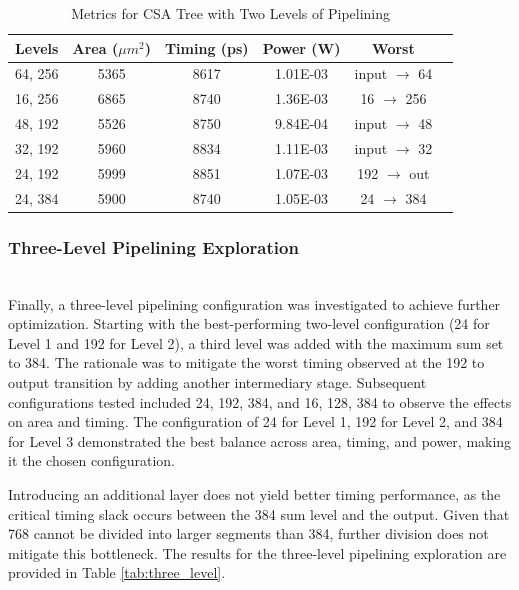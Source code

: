 \documentclass[conference]{IEEEtran}
\begin{document}
\begin{table}[h]
    \centering
    \caption{Metrics for CSA Tree with Two Levels of Pipelining}
    \label{tab:two_level}
    \begin{tabular}{@{}cccccc@{}}
        \toprule
        \textbf{Levels} & \textbf{Area ($\mu m^2$)} & \textbf{Timing (ps)} & \textbf{Power (W)} & \textbf{Worst} \\
        \midrule
        64, 256 & 5365 & 8617 & 1.01E-03 & input $\rightarrow$ 64 \\
        16, 256 & 6865 & 8740 & 1.36E-03 & 16 $\rightarrow$ 256 \\
        48, 192 & 5526 & 8750 & 9.84E-04 & input $\rightarrow$ 48 \\
        32, 192 & 5960 & 8834 & 1.11E-03 & input $\rightarrow$ 32 \\
        24, 192 & 5999 & 8851 & 1.07E-03 & 192 $\rightarrow$ out\\
        24, 384 & 5900 & 8740 & 1.05E-03 & 24 $\rightarrow$ 384 \\
        \bottomrule
    \end{tabular}
\end{table}

\subsubsection{Three-Level Pipelining Exploration}
\hfill\\

Finally, a three-level pipelining configuration was investigated to achieve further optimization. Starting with the best-performing two-level configuration (24 for Level 1 and 192 for Level 2), a third level was added with the maximum sum set to 384. The rationale was to mitigate the worst timing observed at the 192 to output transition by adding another intermediary stage. Subsequent configurations tested included 24, 192, 384, and 16, 128, 384 to observe the effects on area and timing. The configuration of 24 for Level 1, 192 for Level 2, and 384 for Level 3 demonstrated the best balance across area, timing, and power, making it the chosen configuration. 

Introducing an additional layer does not yield better timing performance, as the critical timing slack occurs between the 384 sum level and the output. Given that 768 cannot be divided into larger segments than 384, further division does not mitigate this bottleneck. 
The results for the three-level pipelining exploration are provided in Table \ref{tab:three_level}.
\end{document}
